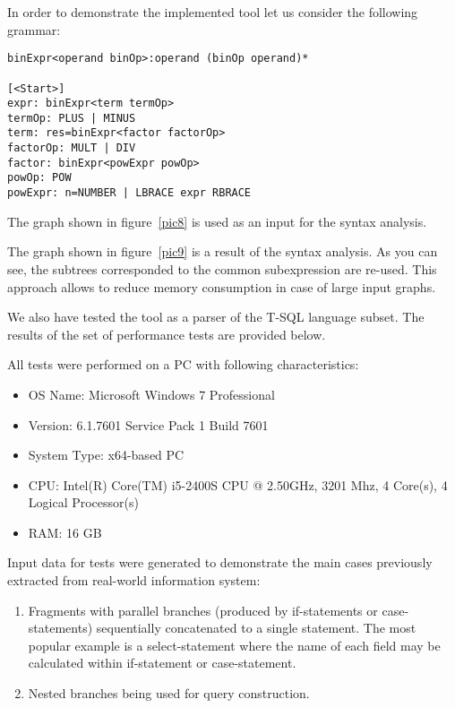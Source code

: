 \documentclass{acm_proc_article-sp}
\begin{document}
In order to demonstrate the implemented tool let us consider the following grammar:

\begin{verbatim}
binExpr<operand binOp>:operand (binOp operand)*

[<Start>]
expr: binExpr<term termOp>
termOp: PLUS | MINUS
term: res=binExpr<factor factorOp>
factorOp: MULT | DIV
factor: binExpr<powExpr powOp>
powOp: POW
powExpr: n=NUMBER | LBRACE expr RBRACE

\end{verbatim}

The graph shown in figure~\ref{pic8} is used as an input for the syntax analysis.

\begin{figure*}
    \centering
    \caption{Input graph.}
    \label{pic8}
\end{figure*}

The graph shown in figure~\ref{pic9} is a result of the syntax analysis. As you can see, the subtrees corresponded to the common subexpression are re-used. This approach allows to reduce memory consumption in case of large input graphs.

\begin{figure*}
    \centering
    \caption{Result of the processing of the graph which presented in figure~\ref{pic8}.}
    \label{pic9}
\end{figure*}



We also have tested the tool as a parser of the T-SQL language subset. The results of the set of performance tests are provided below.

All tests were performed on a PC with following characteristics:
\begin{itemize}
\item OS Name: Microsoft Windows 7 Professional	
\item Version: 6.1.7601 Service Pack 1 Build 7601	
\item System Type: x64-based PC	
\item CPU: Intel(R) Core(TM) i5-2400S CPU @ 2.50GHz, 3201 Mhz, 4 Core(s), 4 Logical Processor(s)	
\item RAM: 16 GB
\end{itemize}

Input data for tests were generated to demonstrate the main cases previously extracted from real-world information system:
\begin{enumerate}
\item Fragments with parallel branches (produced by if-statements or case-statements) sequentially concatenated to a single statement. The most popular example is a select-statement where the name of each field may be calculated within if-statement or case-statement.
\item Nested branches being used for query construction.
\end{enumerate}
\end{document}
